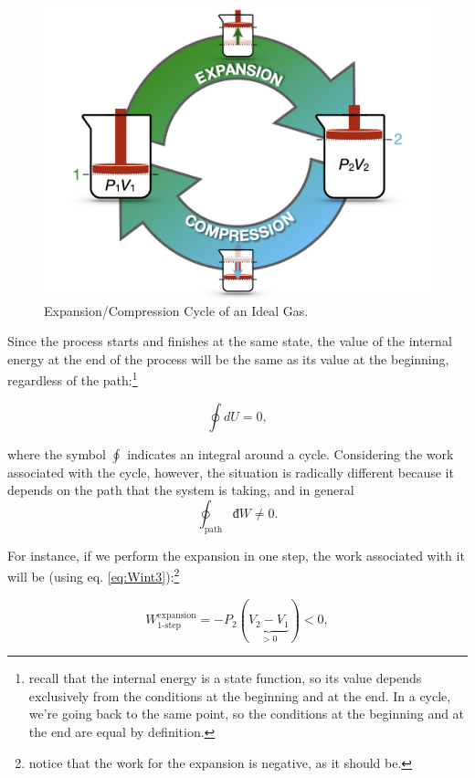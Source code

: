 \documentclass[
  9pt,
]{extbook}
\theoremstyle{definition}
\theoremstyle{definition}
\theoremstyle{definition}
\theoremstyle{remark}
\begin{document}
\begin{figure}

{\centering \includegraphics[width=0.8\linewidth]{./img/OEP_Figures.005} 

}

\caption{Expansion/Compression Cycle of an Ideal Gas.}\label{fig:FigRevCyc}
\end{figure}

Since the process starts and finishes at the same state, the value of the internal energy at the end of the process will be the same as its value at the beginning, regardless of the path:\footnote{recall that the internal energy is a state function, so its value depends exclusively from the conditions at the beginning and at the end. In a cycle, we're going back to the same point, so the conditions at the beginning and at the end are equal by definition.}

\begin{equation}
  \oint dU=0,
  \label{eq:de0}
\end{equation}

where the symbol \(\oint\) indicates an integral around a cycle. Considering the work associated with the cycle, however, the situation is radically different because it depends on the path that the system is taking, and in general
\begin{equation}
\oint_{\text{path}} đW \neq 0.
  \label{eq:dw0}
\end{equation}

For instance, if we perform the expansion in one step, the work associated with it will be (using eq. \eqref{eq:Wint3}):\footnote{notice that the work for the expansion is negative, as it should be.}

\begin{equation}
  W^{\text{expansion}}_{\text{1-step}}=-P_2(\underbrace{V_2-V_1}_{>0})<0,
  \label{eq:Wexp1}
\end{equation}
\end{document}
